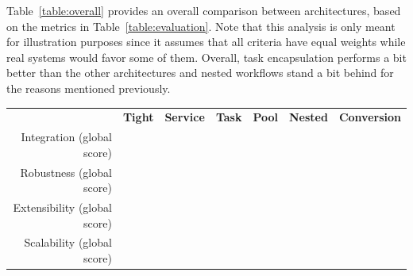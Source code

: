 \documentclass[preprint,3p,twocolumn]{elsarticle}
\begin{document}
Table~\ref{table:overall} provides an overall comparison between
architectures, based on the metrics in Table~\ref{table:evaluation}.
Note that this analysis is only meant for illustration purposes since
it assumes that all criteria have equal weights while real systems
would favor some of them. Overall, task encapsulation performs a bit
better than the other architectures and nested workflows stand a bit
behind for the reasons mentioned previously.
\begin{table}
\footnotesize
\centering
\begin{tabular}{rcccccc}
                                    & \textbf{Tight}
                                    & \textbf{Service}
                                    & \textbf{Task}
                                    & \textbf{Pool}
                                    & \textbf{Nested}
                                    & \textbf{Conversion} \\
  Integration (global score)    &
                                    \cellcolor[HTML]{99FF99}{0.00}
                                    & \cellcolor[HTML]{99E899}{0.22}
                                    & \cellcolor[HTML]{99FF99}{0.00}
                                    & \cellcolor[HTML]{99D299}{0.44}
                                    & \cellcolor[HTML]{999999}{1.00}
                                      & \cellcolor[HTML]{99DD99}{0.33}\\
Robustness (global score) &
                                \cellcolor[HTML]{99F099}{0.14}
                                    & \cellcolor[HTML]{99D399}{0.43}
                                    & \cellcolor[HTML]{99FF99}{0.00}
                                    & \cellcolor[HTML]{99B699}{0.71}
                                    & \cellcolor[HTML]{999999}{1.00}
                                    & \cellcolor[HTML]{99D399}{0.43}\\
  Extensibility (global score)  & \cellcolor[HTML]{99D299}{0.44}
                                     & \cellcolor[HTML]{99D299}{0.44}
                                     & \cellcolor[HTML]{99FF99}{0.00}
                                     & \cellcolor[HTML]{99E899}{0.22}
                                     & \cellcolor[HTML]{999999}{1.00}
                                     & \cellcolor[HTML]{99E899}{0.22}\\
Scalability (global score)  & \cellcolor[HTML]{999999}{1.00}
                                     & \cellcolor[HTML]{99CC99}{0.50}
                                     & \cellcolor[HTML]{99CC99}{0.50}
                                     & \cellcolor[HTML]{99FF99}{0.00}

\end{tabular}
\end{table}
\end{document}
